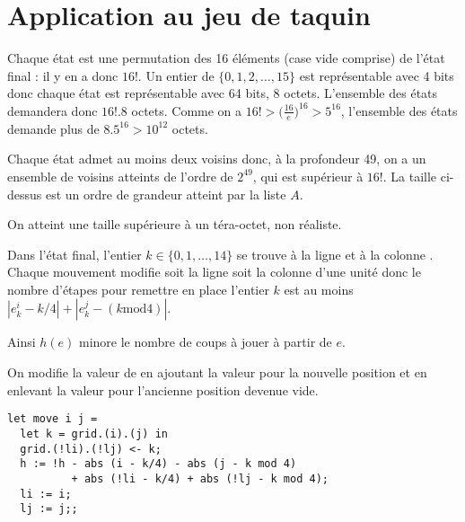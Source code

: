 \section{Application au jeu de taquin}
\begin{Exercise} 
Chaque état est une permutation des 16 éléments (case vide comprise) de l'état final : il y en a donc $16!$. Un entier de $\{0, 1 , 2, \ldots, 15\}$ est représentable avec 4 bits donc chaque état est représentable avec 64 bits, 8 octets. L'ensemble des états demandera donc $16!.8$ octets. Comme on a $16! > \bigl(\frac{16}e\bigr)^{16} > 5^{16}$, l'ensemble des états demande
plus de $8.5^{16}> 10^{12}$ octets. 

Chaque état admet au moins deux voisins donc, à la profondeur 49, on a un ensemble de voisins atteints de l'ordre de $2^{49}$, qui est supérieur à $16!$. La taille ci-dessus est un ordre de grandeur atteint par la liste $A$.

On atteint une taille supérieure à un téra-octet, non réaliste.
\end{Exercise}
\begin{Exercise} 
Dans l’état final, l’entier $k\in \{0, 1, \ldots, 14\}$ se trouve à la ligne  et à la colonne . Chaque mouvement modifie soit la ligne soit la colonne d’une unité donc le nombre d'étapes pour remettre en place l'entier $k$ est au moins $|e_k^i- k/4| + |e_k^j - (k \text{mod} 4)|$.

Ainsi $h(e)$  minore le nombre de coups à jouer à partir de $e$.
\end{Exercise}
\begin{Exercise} 
On modifie la valeur de  en ajoutant la valeur pour la nouvelle position  et en enlevant la valeur pour l'ancienne position  devenue vide.
\begin{lstlisting} 
let move i j =
  let k = grid.(i).(j) in
  grid.(!li).(!lj) <- k;
  h := !h - abs (i - k/4) - abs (j - k mod 4) 
          + abs (!li - k/4) + abs (!lj - k mod 4);
  li := i; 
  lj := j;;
\end{lstlisting}
\end{Exercise}
\newpage

